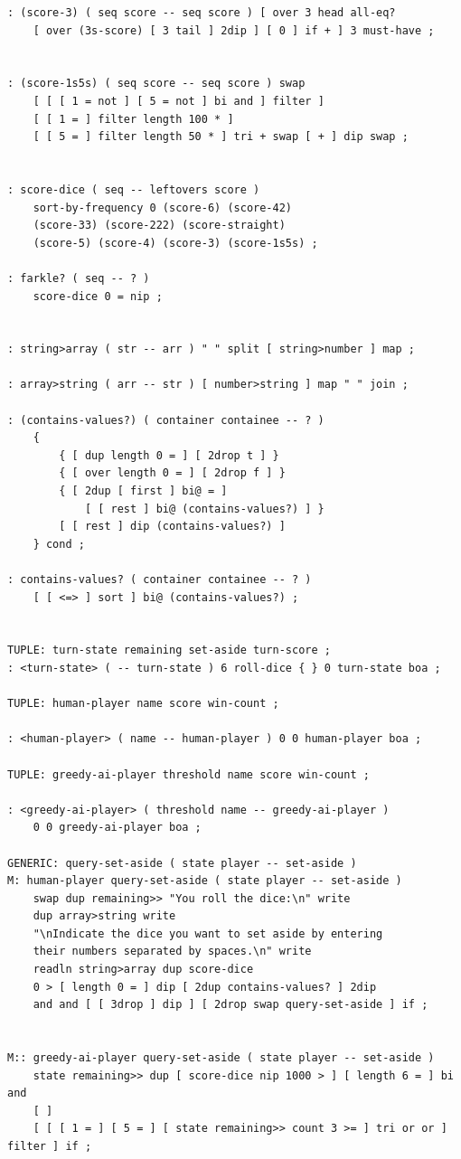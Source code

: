 \documentclass{article}
\begin{document}
\begin{lstlisting}
: (score-3) ( seq score -- seq score ) [ over 3 head all-eq?
    [ over (3s-score) [ 3 tail ] 2dip ] [ 0 ] if + ] 3 must-have ;


: (score-1s5s) ( seq score -- seq score ) swap
    [ [ [ 1 = not ] [ 5 = not ] bi and ] filter ]
    [ [ 1 = ] filter length 100 * ] 
    [ [ 5 = ] filter length 50 * ] tri + swap [ + ] dip swap ;


: score-dice ( seq -- leftovers score )
    sort-by-frequency 0 (score-6) (score-42)
    (score-33) (score-222) (score-straight)
    (score-5) (score-4) (score-3) (score-1s5s) ;

: farkle? ( seq -- ? )
    score-dice 0 = nip ;


: string>array ( str -- arr ) " " split [ string>number ] map ;

: array>string ( arr -- str ) [ number>string ] map " " join ;

: (contains-values?) ( container containee -- ? )
    {
        { [ dup length 0 = ] [ 2drop t ] }
        { [ over length 0 = ] [ 2drop f ] }
        { [ 2dup [ first ] bi@ = ] 
            [ [ rest ] bi@ (contains-values?) ] }
        [ [ rest ] dip (contains-values?) ] 
    } cond ;

: contains-values? ( container containee -- ? ) 
    [ [ <=> ] sort ] bi@ (contains-values?) ;


TUPLE: turn-state remaining set-aside turn-score ;
: <turn-state> ( -- turn-state ) 6 roll-dice { } 0 turn-state boa ;

TUPLE: human-player name score win-count ;

: <human-player> ( name -- human-player ) 0 0 human-player boa ;

TUPLE: greedy-ai-player threshold name score win-count ;

: <greedy-ai-player> ( threshold name -- greedy-ai-player )
    0 0 greedy-ai-player boa ;

GENERIC: query-set-aside ( state player -- set-aside )
M: human-player query-set-aside ( state player -- set-aside )
    swap dup remaining>> "You roll the dice:\n" write
    dup array>string write
    "\nIndicate the dice you want to set aside by entering
    their numbers separated by spaces.\n" write
    readln string>array dup score-dice
    0 > [ length 0 = ] dip [ 2dup contains-values? ] 2dip
    and and [ [ 3drop ] dip ] [ 2drop swap query-set-aside ] if ;


M:: greedy-ai-player query-set-aside ( state player -- set-aside )
    state remaining>> dup [ score-dice nip 1000 > ] [ length 6 = ] bi and
    [ ]
    [ [ [ 1 = ] [ 5 = ] [ state remaining>> count 3 >= ] tri or or ] filter ] if ;


\end{lstlisting}
\end{document}
